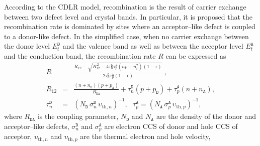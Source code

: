 \documentclass[aip,jap, amsmath,amssymb,reprint]{revtex4-1}
\begin{document}
According to the CDLR model, recombination is the result of carrier exchange between two defect level and crystal bands.
In particular, it is proposed \cite{CDLR:JAP} that the recombination rate is dominated by sites where an acceptor--like defect is coupled to a donor-like defect.
In the simplified case, when
no carrier exchange between the donor level $E_t^{\mathtt{D}}$ and the valence band
as well as between the acceptor level $E_t^{\mathtt{A}}$ and the conduction band,
the recombination rate $R$ can be expressed\cite{CDLR:JAP1995} as
\begin{eqnarray}
R&=&\frac{R_{12}-\sqrt{R_{12}^{\,2}-4\tau_{n}^{\mathtt{D}}\tau_{p}^{\mathtt{A}}(np-n_i^2)(1-\epsilon)}}{2\tau_{n}^{\mathtt{D}}\tau_{p}^{\mathtt{A}}(1-\epsilon)}\;,\label{eqR}\\
R_{12}&=&\frac{(n+n_{\mathtt{D}})(p+p_{\mathtt{A}})}{R_{\mathtt{DA}}}+
\tau_{n}^{\mathtt{D}}(p+p_{\mathtt{D}})+\tau_{p}^{\mathtt{A}}(n+n_{\mathtt{A}}),\label{eqR12}\\
\tau_{n}^{\mathtt{D}}&=&(N_{\mathtt{D}}\,\sigma_{n}^{\mathtt{D}}\,\upsilon_{\mathrm{th},n})^{-1},\,\,\,\,
\tau_{p}^{\mathtt{A}}=(N_{\mathtt{A}}\,\sigma_{p}^{\mathtt{A}}\,\upsilon_{\mathrm{th},p})^{-1},\label{eqTAU}
\end{eqnarray}
where
$R_{\mathtt{DA}}$ is the coupling parameter,
$N_{\mathtt{D}}$ and $N_{\mathtt{A}}$ are the density of the donor and acceptor--like defects,
$\sigma_{n}^{\mathtt{D}}$ and $\sigma_{p}^{\mathtt{A}}$ are electron CCS of donor and hole CCS of acceptor,
$\upsilon_{\mathrm{th},n}$ and $\upsilon_{\mathrm{th},p}$ are the thermal electron and hole velocity,
\end{document}

